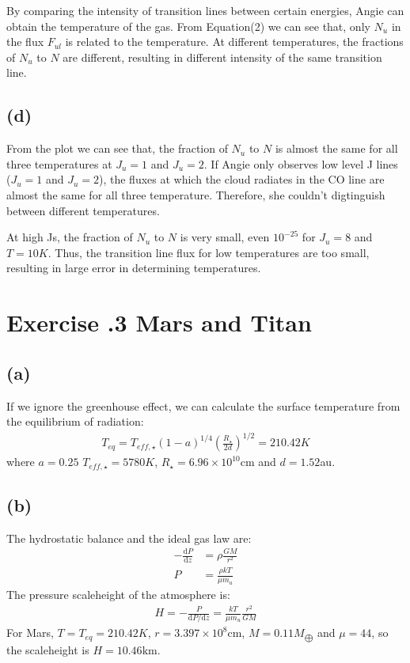 \documentclass[a4paper,12pt]{article}
\renewcommand{\d}{\mathrm{d}}
\newcommand{\cm}{\mathrm{cm}}
\begin{document}
 By comparing the intensity of transition lines between certain energies, Angie can obtain the temperature of the gas.
 From Equation(2) we can see that, only $N_u$ in the flux $F_{ul}$ is related to the temperature. At different temperatures, 
 the fractions of $N_u$ to $N$ are different, resulting in different intensity of the same transition line.


\subsection*{(d)}
From the plot we can see that, the fraction of $N_u$ to $N$ is almost the same for all three temperatures at $J_u=1$ and $J_u = 2$. 
If Angie only observes low level J lines ($J_u=1$ and $J_u = 2$), the fluxes at which the cloud radiates in the CO line are 
almost the same for all three temperature. Therefore, she couldn't digtinguish between different temperatures.

At high Js, the fraction of $N_u$ to $N$ is very small, even $10^{-25}$ for $J_u=8$ and $T=10K$. Thus, the transition line flux 
for low temperatures are too small, resulting in large error in determining temperatures.

\section*{\textbf{Exercise \uppercase\expandafter{}.3 Mars and Titan}}
\subsection*{(a)}
If we ignore the greenhouse effect, we can calculate the 
surface temperature from the equilibrium of radiation:
\begin{align*}
    T_{eq} = T_{eff, \star} (1-a)^{1/4} (\frac{R_\star}{2d})^{1/2} = 210.42 K
\end{align*}
where $a=0.25$ $T_{eff, \star}=5780K$, $R_\star = 6.96 \times 10^{10} \cm$ and $d=1.52$au.

\subsection*{(b)}
The hydrostatic balance and the ideal gas law are:
\begin{align*}
    -\frac{\d P}{\d z} &= \rho \frac{GM}{r^2} \\
    P &= \frac{\rho kT}{\mu m_u}
\end{align*}
The pressure scaleheight of the atmosphere is:
\begin{align*}
    H = -\frac{P}{\d P/ \d z} = \frac{kT}{\mu m_u} \frac{r^2}{GM}
\end{align*}
For Mars, $T = T_{eq} = 210.42 K$, $r = 3.397\times10^8 \cm$, 
$M = 0.11 M_{\bigoplus}$ and $\mu=44$, so the scaleheight is $H = 10.46 \text{km}$.
\end{document}
